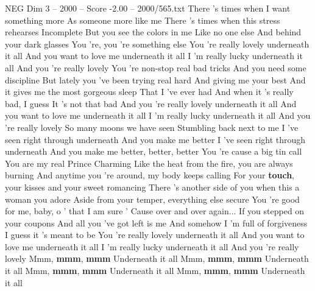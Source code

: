 \begin{textsample}{NEG Dim 3 – 2000 – Score -2.00 – 2000/565.txt}  \label{ex:f3_neg_011}
There 's times when I want something more As someone more like me There 's times when this stress rehearses Incomplete But you see the colors in me Like no one else And behind your dark glasses You 're, you 're something else You 're really lovely underneath it all And you want to love me underneath it all I 'm really lucky underneath it all And you 're really lovely You 're non-stop real bad tricks And you need some discipline But lately you 've been trying real hard And giving me your best And it gives me the most gorgeous sleep That I 've ever had And when it 's really bad, I guess It 's not that bad And you 're really lovely underneath it all And you want to love me underneath it all I 'm really lucky underneath it all And you 're really lovely So many moons we have seen Stumbling back next to me I 've seen right through underneath And you make me better I 've seen right through underneath And you make me better, better, better You 're cause a big tin call You are my real Prince Charming Like the heat from the fire, you are always burning And anytime you 're around, my body keeps calling For your \textbf{touch}, your kisses and your sweet romancing There 's another side of you when this a woman you adore Aside from your temper, everything else secure You 're good for me, baby, o ' that I am sure ' Cause over and over again...
If you stepped on your coupons And all you 've got left is me And somehow I 'm full of forgiveness I guess it 's meant to be You 're really lovely underneath it all And you want to love me underneath it all I 'm really lucky underneath it all And you 're really lovely Mmm, \textbf{mmm}, \textbf{mmm} Underneath it all Mmm, \textbf{mmm}, \textbf{mmm} Underneath it all Mmm, \textbf{mmm}, \textbf{mmm} Underneath it all Mmm, \textbf{mmm}, \textbf{mmm} Underneath it all

\end{textsample}
